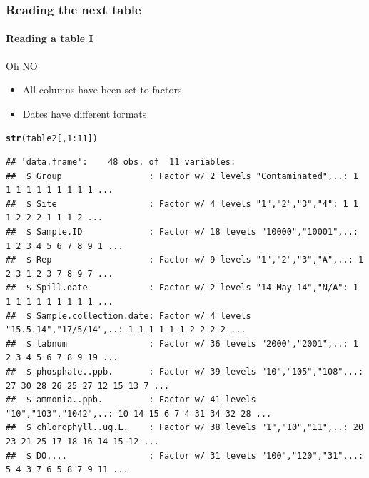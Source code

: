 \documentclass[12pt]{beamer}\usepackage[]{graphicx}\usepackage[]{color}
\makeatletter
\newcommand{\hlnum}[1]{\textcolor[rgb]{0.686,0.059,0.569}{#1}}%
\newcommand{\hlopt}[1]{\textcolor[rgb]{0,0,0}{#1}}%
\newcommand{\hlstd}[1]{\textcolor[rgb]{0.345,0.345,0.345}{#1}}%
\newcommand{\hlkwd}[1]{\textcolor[rgb]{0.737,0.353,0.396}{\textbf{#1}}}%
\newenvironment{kframe}{%
 \def\at@end@of@kframe{}%
 \ifinner\ifhmode%
  \def\at@end@of@kframe{\end{minipage}}%
  \begin{minipage}{\columnwidth}%
 \fi\fi%
 \def\FrameCommand##1{\hskip\@totalleftmargin \hskip-\fboxsep
 \colorbox{shadecolor}{##1}\hskip-\fboxsep
     \hskip-\linewidth \hskip-\@totalleftmargin \hskip\columnwidth}%
 \MakeFramed {\advance\hsize-\width
   \@totalleftmargin\z@ \linewidth\hsize
   \@setminipage}}%
 {\par\unskip\endMakeFramed%
 \at@end@of@kframe}
\newenvironment{knitrout}{}{} %
\makeatother
\begin{document}
\begin{frame}[fragile]
  \frametitle{Reading the next table}
  \framesubtitle{Reading a table I}
  \begin{alert}{Oh NO}
\begin{itemize}  
\item All columns have been set to factors
\item Dates have different formats
\end{itemize}
\end{alert}
\begin{knitrout}
\color{fgcolor}\begin{kframe}
\begin{alltt}
\hlkwd{str}\hlstd{(table2[,}\hlnum{1}\hlopt{:}\hlnum{11}\hlstd{])}
\end{alltt}
\begin{verbatim}
## 'data.frame':	48 obs. of  11 variables:
##  $ Group                 : Factor w/ 2 levels "Contaminated",..: 1 1 1 1 1 1 1 1 1 1 ...
##  $ Site                  : Factor w/ 4 levels "1","2","3","4": 1 1 1 2 2 2 1 1 1 2 ...
##  $ Sample.ID             : Factor w/ 18 levels "10000","10001",..: 1 2 3 4 5 6 7 8 9 1 ...
##  $ Rep                   : Factor w/ 9 levels "1","2","3","A",..: 1 2 3 1 2 3 7 8 9 7 ...
##  $ Spill.date            : Factor w/ 2 levels "14-May-14","N/A": 1 1 1 1 1 1 1 1 1 1 ...
##  $ Sample.collection.date: Factor w/ 4 levels "15.5.14","17/5/14",..: 1 1 1 1 1 1 2 2 2 2 ...
##  $ labnum                : Factor w/ 36 levels "2000","2001",..: 1 2 3 4 5 6 7 8 9 19 ...
##  $ phosphate..ppb.       : Factor w/ 39 levels "10","105","108",..: 27 30 28 26 25 27 12 15 13 7 ...
##  $ ammonia..ppb.         : Factor w/ 41 levels "10","103","1042",..: 10 14 15 6 7 4 31 34 32 28 ...
##  $ chlorophyll..ug.L.    : Factor w/ 38 levels "1","10","11",..: 20 23 21 25 17 18 16 14 15 12 ...
##  $ DO....                : Factor w/ 31 levels "100","120","31",..: 5 4 3 7 6 5 8 7 9 11 ...
\end{verbatim}
\end{kframe}
\end{knitrout}

\end{frame}
\end{document}
